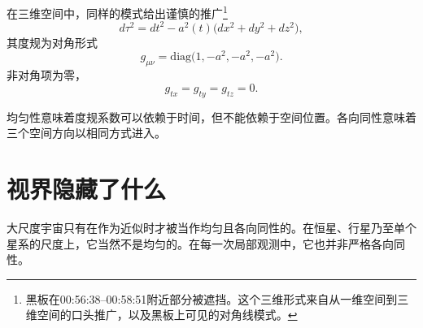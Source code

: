 在三维空间中，同样的模式给出谨慎的推广\footnote{黑板在00:56:38--00:58:51附近部分被遮挡。这个三维形式来自从一维空间到三维空间的口头推广，以及黑板上可见的对角线模式。}
\begin{equation}
d\tau^2=dt^2-a^2(t)\bigl(dx^2+dy^2+dz^2\bigr),
\end{equation}
其度规为对角形式
\begin{equation}
g_{\mu\nu}=\mathrm{diag}\bigl(1,-a^2,-a^2,-a^2\bigr).
\end{equation}
非对角项为零，
\begin{equation}
g_{tx}=g_{ty}=g_{tz}=0.
\end{equation}

均匀性意味着度规系数可以依赖于时间，但不能依赖于空间位置。各向同性意味着三个空间方向以相同方式进入。

\begin{classroomqa}
\end{classroomqa}

\begin{classroomqa}
\end{classroomqa}

\begin{classroomqa}
\end{classroomqa}

\section{视界隐藏了什么}

大尺度宇宙只有在作为近似时才被当作均匀且各向同性的。在恒星、行星乃至单个星系的尺度上，它当然不是均匀的。在每一次局部观测中，它也并非严格各向同性。

